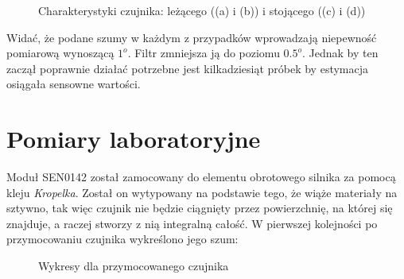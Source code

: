 \begin{figure}[H]
{    }
    \hfill
    \caption{Charakterystyki czujnika: leżącego ((a) i (b)) i stojącego ((c) i (d))}
    \label{fig:szum_sit}
\end{figure}

Widać, że podane szumy w każdym z przypadków wprowadzają niepewność pomiarową wynoszącą $1^{o}$. Filtr zmniejsza ją do poziomu $0.5^{o}$. Jednak by ten zaczął poprawnie działać potrzebne jest kilkadziesiąt próbek by estymacja osiągała sensowne wartości.

\section{Pomiary laboratoryjne}

Moduł SEN0142 został zamocowany do elementu obrotowego silnika za pomocą kleju \emph{Kropelka}. Został on wytypowany na podstawie tego, że wiąże materiały na sztywno, tak więc czujnik nie będzie ciągnięty przez powierzchnię, na której się znajduje, a raczej stworzy z nią integralną całość. W pierwszej kolejności po przymocowaniu czujnika wykreślono jego szum:

\begin{figure}[H]
    \hfill
    \caption{Wykresy dla przymocowanego czujnika}
    \label{fig:szumu_szumu}
\end{figure}

